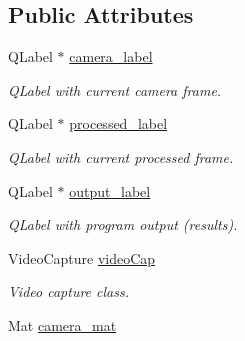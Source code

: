 \subsection*{\-Public \-Attributes}
\begin{DoxyCompactItemize}
\item 
\hypertarget{classDiodeFinder_aec17871d18595315f121c7f7e0cec985}{\-Q\-Label $\ast$ \hyperlink{classDiodeFinder_aec17871d18595315f121c7f7e0cec985}{camera\-\_\-label}}\label{classDiodeFinder_aec17871d18595315f121c7f7e0cec985}

\begin{DoxyCompactList}\small\item\em \-Q\-Label with current camera frame. \end{DoxyCompactList}\item 
\hypertarget{classDiodeFinder_abc59dcea66433ca0ae0f2baab2d768eb}{\-Q\-Label $\ast$ \hyperlink{classDiodeFinder_abc59dcea66433ca0ae0f2baab2d768eb}{processed\-\_\-label}}\label{classDiodeFinder_abc59dcea66433ca0ae0f2baab2d768eb}

\begin{DoxyCompactList}\small\item\em \-Q\-Label with current processed frame. \end{DoxyCompactList}\item 
\hypertarget{classDiodeFinder_a80896a062265941aef7a43bac48fb748}{\-Q\-Label $\ast$ \hyperlink{classDiodeFinder_a80896a062265941aef7a43bac48fb748}{output\-\_\-label}}\label{classDiodeFinder_a80896a062265941aef7a43bac48fb748}

\begin{DoxyCompactList}\small\item\em \-Q\-Label with program output (results). \end{DoxyCompactList}\item 
\hypertarget{classDiodeFinder_aff87584df7147b928aed83cc5d453fed}{\-Video\-Capture \hyperlink{classDiodeFinder_aff87584df7147b928aed83cc5d453fed}{video\-Cap}}\label{classDiodeFinder_aff87584df7147b928aed83cc5d453fed}

\begin{DoxyCompactList}\small\item\em \-Video capture class. \end{DoxyCompactList}\item 
\hypertarget{classDiodeFinder_aa93cdfa519f3f1cb7dcac650275c5a51}{\-Mat \hyperlink{classDiodeFinder_aa93cdfa519f3f1cb7dcac650275c5a51}{camera\-\_\-mat}}\label{classDiodeFinder_aa93cdfa519f3f1cb7dcac650275c5a51}


\end{DoxyCompactItemize}
